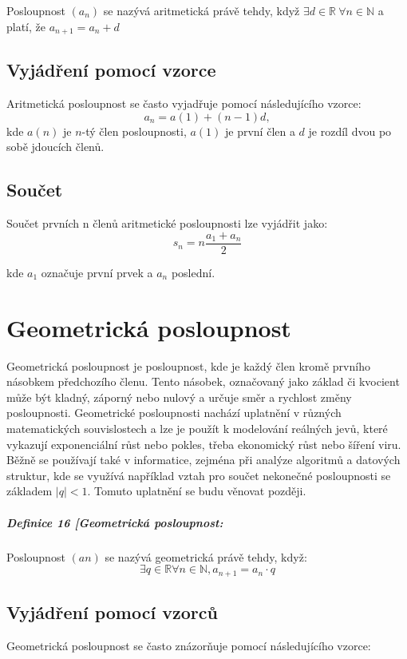\documentclass[12pt]{report}			%
\begin{document}
Posloupnost $(a_n)$ se nazývá aritmetická právě tehdy, když $\exists d \in \mathbb{R} \ \forall n \in \mathbb{N}$ a platí, že $a_{n+1} = a_n + d$


\section{Vyjádření pomocí vzorce}

Aritmetická posloupnost se často vyjadřuje pomocí následujícího vzorce:
\begin{equation}
a_n  = a(1) + (n-1)d,
\end{equation}
kde $a(n)$ je $n$-tý člen posloupnosti, $a(1)$ je první člen a $d$ je rozdíl dvou po sobě jdoucích členů. \section{Součet}
Součet prvních n členů aritmetické posloupnosti lze vyjádřit jako:
\begin{equation}
s_n=n\frac{a_1+a_n}{2}
\end{equation}

kde $a_1$ označuje první prvek a $a_n$ poslední.

\chapter{Geometrická posloupnost}
Geometrická posloupnost je posloupnost, kde je každý člen kromě prvního násobkem předchozího členu. Tento násobek, označovaný jako základ či kvocient může být kladný, záporný nebo nulový a určuje směr a rychlost změny posloupnosti.
Geometrické posloupnosti nachází uplatnění v různých matematických souvislostech a lze je použít k modelování reálných jevů, které vykazují exponenciální růst nebo pokles, třeba ekonomický růst nebo šíření viru. Běžně se používají také v informatice, zejména při analýze algoritmů a datových struktur, kde se využívá například vztah pro součet nekonečné posloupnosti se základem $|q| < 1$. Tomuto uplatnění se budu věnovat později. 

\paragraph{Definice 16 [Geometrická posloupnost:}
Posloupnost $(an)$ se nazývá geometrická právě tehdy, když: 
$$\exists q \in \mathbb{R} \forall n \in \mathbb{N}, a_{n+1} = a_n \cdot q$$
\section{Vyjádření pomocí vzorců}
Geometrická posloupnost se často znázorňuje pomocí následujícího vzorce:
\end{document}
